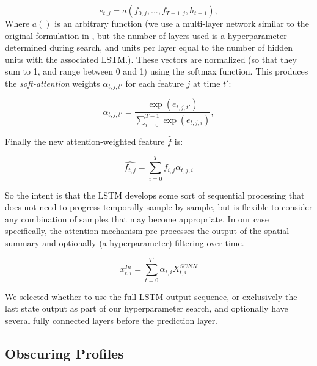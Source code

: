 \documentclass[fleqn,10pt]{wlscirep}
\begin{document}
\begin{equation} 
  e_{t, j} = a(f_{0, j},..., f_{T-1, j}, h_{t-1}),
\end{equation}
Where $a()$ is an arbitrary function (we use a multi-layer network similar to the original formulation in \cite{Zhu}, but the number of layers used is a hyperparameter determined during search, and units per layer equal to the number of hidden units with the associated LSTM.). These vectors are normalized (so that they sum to 1, and range between 0 and 1) using the softmax function. This produces the {\em soft-attention} weights $\alpha_{t,j,t'}$ for each feature $j$ at time $t'$:

\begin{equation} \label{eq:attn_nrg}
  \alpha_{t,j,t'} =  \frac{\exp(e_{t,j,t'})}{\sum_{i=0}^{T-1}\exp(e_{t,j,i})},
\end{equation}

Finally the new attention-weighted feature $\hat{f}$ is: 

\begin{equation} \label{eq:attn}
    \hat{f_{t,j}} = \sum_{i=0}^{T} f_{i,j} \alpha_{t,j,i}
\end{equation}

So the intent is that the LSTM develops some sort of sequential processing that does not need to progress temporally sample by sample, but is flexible to consider any combination of samples that may become appropriate. In our case specifically, the attention mechanism pre-processes the output of the spatial summary and optionally (a hyperparameter) filtering over time.

\begin{equation}
  x_{t,i}^{In} = \sum_{t=0}^{T'} \alpha_{t,i} X_{t,i}^{SCNN}
\end{equation}

We selected whether to use the full LSTM output sequence, or exclusively the last state output as part of our hyperparameter search, and optionally have several fully connected layers before the prediction layer.

\subsection*{Obscuring Profiles}
\end{document}
